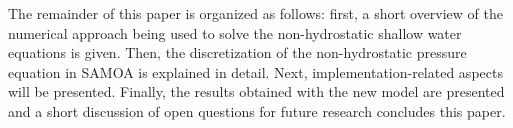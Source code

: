 The remainder of this paper is organized as follows: first, a short overview of the numerical approach being used to solve the non-hydrostatic shallow water equations is given. Then, the discretization of the non-hydrostatic pressure equation in SAMOA is explained in detail. Next, implementation-related aspects will be presented. Finally, the results obtained with the new model are presented and a short discussion of open questions for future research concludes this paper.


